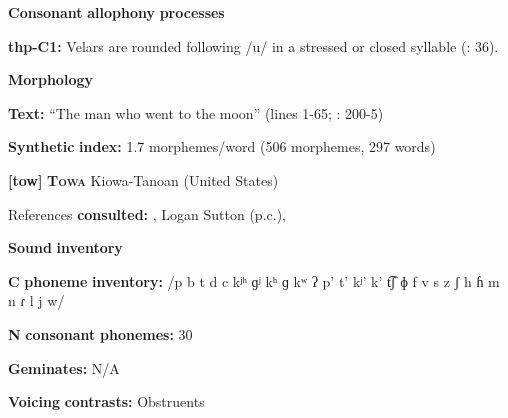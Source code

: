 \documentclass[output=paper]{langsci/langscibook}
\begin{document}
\begin{styleBody}
\textbf{Consonant} \textbf{allophony} \textbf{processes}
\end{styleBody}

\begin{styleBody}
\textbf{thp-C1:} Velars are rounded following /u/ in a stressed or closed syllable (\citealt{ThompsonThompson1992}: 36).
\end{styleBody}

\begin{styleBody}
\textbf{Morphology}
\end{styleBody}

\begin{styleBody}
\textbf{Text:} “The man who went to the moon” (lines 1-65; \citealt{ThompsonThompson1992}: 200-5)
\end{styleBody}

\begin{styleBody}
\textbf{Synthetic} \textbf{index:} 1.7 morphemes/word (506 morphemes, 297 words)
\end{styleBody}

\begin{styleBody}
\textbf{[tow]}   \textbf{\textsc{Towa}  }  Kiowa-Tanoan (United States)
\end{styleBody}

\begin{styleBody}
References \textbf{consulted:} \citet{Bell1993}, Logan Sutton (p.c.), \citet{Yumitani1998}
\end{styleBody}

\begin{styleBody}
\textbf{Sound} \textbf{inventory}
\end{styleBody}

\begin{styleBody}
\textbf{C} \textbf{phoneme} \textbf{inventory:} /p b t d c kʲʰ ɡʲ kʰ ɡ kʷ ʔ p’ t’ kʲ’ k’ t͡ʃ ɸ f v s z ʃ h ɦ m n ɾ l j w/
\end{styleBody}

\begin{styleBody}
\textbf{N} \textbf{consonant} \textbf{phonemes:} 30
\end{styleBody}

\begin{styleBody}
\textbf{Geminates:} N/A
\end{styleBody}

\begin{styleBody}
\textbf{Voicing} \textbf{contrasts:} Obstruents
\end{styleBody}
\end{document}
